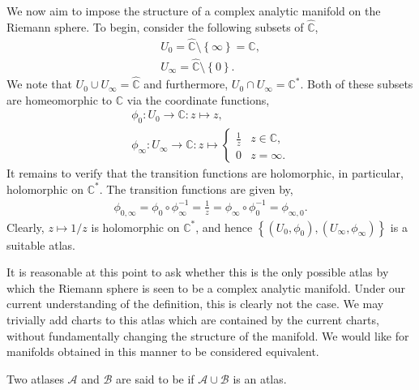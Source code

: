 \begin{example}\label{ex:Ch-analytic-manifold}
	We now aim to impose the structure of a complex analytic manifold on the Riemann
	sphere. To begin, consider the following subsets of $ \hat{\mathbb{C}} $,
	\begin{gather*}
		U_0 = \hat{\mathbb{C}}\setminus \left\{ \infty \right\} = \mathbb{C},\\
		U_{\infty} = \hat{\mathbb{C}} \setminus \left\{ 0 \right\}.
	\end{gather*}
	We note that $ U_0 \cup U _{\infty} = \hat{\mathbb{C}} $ and furthermore, $ U_0
		\cap U _{\infty} = \mathbb{C}^{*} $. Both of these subsets are homeomorphic to
	$ \mathbb{C} $ via the coordinate functions,
	\begin{gather*}
		\phi_0:U_0 \to \mathbb{C}:z \mapsto z,\\
		\phi _{\infty}:U _{\infty}\to \mathbb{C}:z \mapsto \begin{cases}
			\frac{1}{z} & z \in \mathbb{C}, \\
			0           & z = \infty.
		\end{cases}
	\end{gather*}
	It remains to verify that the transition functions are holomorphic, in
	particular, holomorphic on $ \mathbb{C}^{*} $. The transition functions are
	given by,
	\begin{align*}
		\phi _{0, \infty} = \phi_0 \circ \phi _{\infty}^{-1} = \frac{1}{z} = \phi
		_{\infty} \circ \phi_0 ^{-1} = \phi _{\infty, 0}.
	\end{align*}
	Clearly, $ z \mapsto 1/z $ is holomorphic on $ \mathbb{C}^{*} $, and hence $
		\left\{ (U_0, \phi_0), (U _{\infty}, \phi _{\infty}) \right\} $ is a suitable atlas.
\end{example}

It is reasonable at this point to ask whether this is the only possible atlas by
which the Riemann sphere is seen to be a complex analytic manifold. Under our
current understanding of the definition, this is clearly not the case. We may
trivially add charts to this atlas which are contained by the current charts,
without fundamentally changing the structure of the manifold. We would like for
manifolds obtained in this manner to be considered equivalent.

\begin{definition}
	Two atlases $ \mathcal{A} $ and $ \mathcal{B} $ are said to be
	 if $ \mathcal{A}\cup \mathcal{B} $ is an atlas.
\end{definition}

